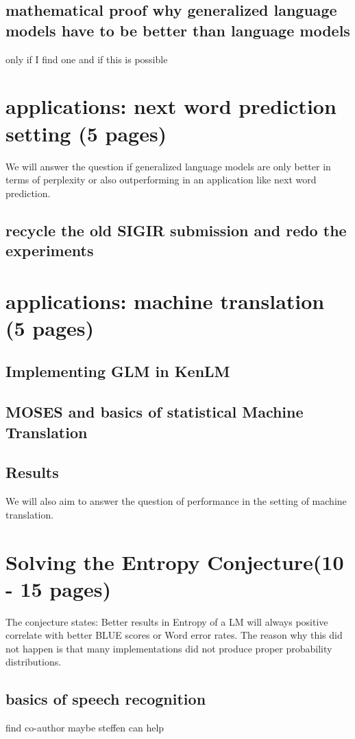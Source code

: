 \section{mathematical proof why generalized language models have to be better than language models}
only if I find one and if this is possible



\chapter{applications: next word prediction setting (5 pages)}
We will answer the question if generalized language models are only better in terms of perplexity or also outperforming in an application like next word prediction.
\section{recycle the old SIGIR submission and redo the experiments}

\chapter{applications: machine translation (5 pages)}
\section{Implementing GLM in KenLM}
\section{MOSES and basics of statistical Machine Translation}
\section{Results}
We will also aim to answer the question of performance in the setting of machine translation.


\chapter{Solving the Entropy Conjecture(10 - 15 pages)}
The conjecture states: Better results in Entropy of a LM will always positive correlate with better BLUE scores or Word error rates. The reason why this did not happen is that many implementations did not produce proper probability distributions.
\section{basics of speech recognition}
find co-author maybe steffen can help
